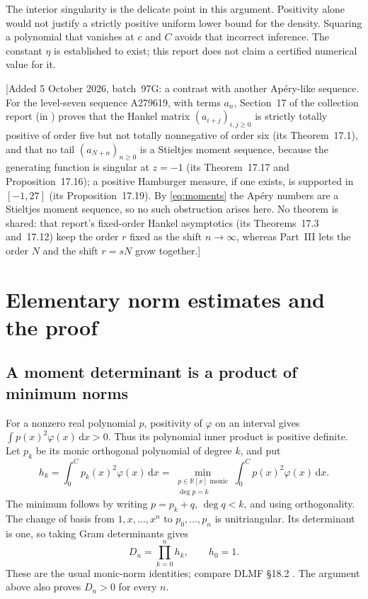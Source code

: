 \documentclass[11pt,a4paper]{article}
\numberwithin{equation}{section}
\theoremstyle{remark}\newtheorem{remark}[theorem]{Remark}
\newcommand{\dd}{\,\mathrm d}
\newcommand{\R}{\mathbb R}
\begin{document}
The interior singularity is the delicate point in this argument. Positivity
alone would not justify a strictly positive uniform lower bound for the
density. Squaring a polynomial that vanishes at $c$ and $C$ avoids that
incorrect inference. The constant $\eta$ is established to exist; this report
does not claim a certified numerical value for it.

[Added 5 October 2026, batch~97G: a contrast with another Ap\'ery-like
sequence. For the level-seven sequence A279619, with terms $a_n$, Section~17
of the collection report  (in
)
proves that the Hankel matrix $(a_{i+j})_{i,j\geq0}$ is strictly totally
positive of order five but not totally nonnegative of order six (its
Theorem~17.1), and that no tail $(a_{N+n})_{n\geq0}$ is a Stieltjes moment
sequence, because the generating function is singular at $z=-1$ (its
Theorem~17.17 and Proposition~17.16); a positive Hamburger measure, if one
exists, is supported in $[-1,27]$ (its Proposition~17.19). By
\eqref{eq:moments} the Ap\'ery numbers are a Stieltjes moment sequence, so
no such obstruction arises here. No theorem is shared: that report's
fixed-order Hankel asymptotics (its Theorems~17.3 and~17.12) keep the order
$r$ fixed as the shift $n\to\infty$, whereas Part~III lets the order $N$ and
the shift $r=sN$ grow together.]

\section{Elementary norm estimates and the proof}
\subsection{A moment determinant is a product of minimum norms}
For a nonzero real polynomial $p$, positivity of $\varphi$ on an interval gives
$\int p(x)^2\varphi(x)\dd x>0$. Thus its polynomial inner product is positive
definite. Let $p_k$ be its monic orthogonal polynomial of degree $k$, and put
\begin{equation}\label{eq:hk}
 h_k=\int_0^C p_k(x)^2\varphi(x)\dd x
 =\min_{\substack{p\in\R[x]\text{ monic}\\\deg p=k}}
      \int_0^C p(x)^2\varphi(x)\dd x.
\end{equation}
The minimum follows by writing $p=p_k+q$, $\deg q<k$, and using orthogonality.
The change of basis from $1,x,\ldots,x^n$ to $p_0,\ldots,p_n$ is unitriangular.
Its determinant is one, so taking Gram determinants gives
\begin{equation}\label{eq:product}
 D_n=\prod_{k=0}^n h_k,\qquad h_0=1.
\end{equation}
These are the usual monic-norm identities; compare DLMF \S18.2
\cite{dlmf}. The argument above also proves $D_n>0$ for every $n$.
\end{document}
